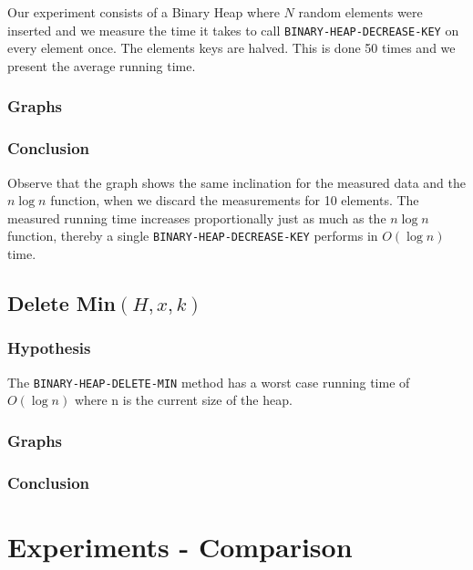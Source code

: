 \documentclass[a4paper,oneside,11pt]{article}
\begin{document}
Our experiment consists of a Binary Heap where $N$ random elements were inserted and we measure the time it takes to call \texttt{BINARY-HEAP-DECREASE-KEY} on every element once. The elements keys are halved. This is done 50 times and we present the average running time.
\subsubsection*{Graphs}

\subsubsection*{Conclusion}
Observe that the graph shows the same inclination for the measured data and the $n\log n$ function, when we discard the measurements for 10 elements. The measured running time increases proportionally just as much as the $n\log n$ function, thereby a single \texttt{BINARY-HEAP-DECREASE-KEY} performs in $O(\log n)$ time.

\subsection*{Delete Min$(H,x,k)$}

\subsubsection*{Hypothesis}
The \texttt{BINARY-HEAP-DELETE-MIN} method has a worst case running time of $O(\log n)$ where n is the current size of the heap.
\subsubsection*{Graphs}

\subsubsection*{Conclusion}

\section*{Experiments - Comparison}
\end{document}
